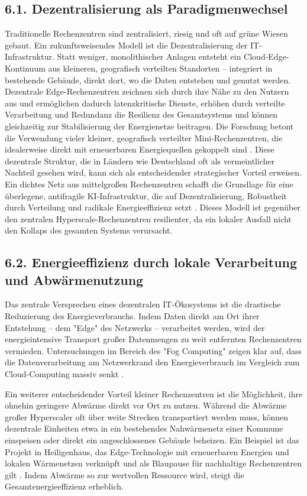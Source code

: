 \documentclass[12pt, a4paper]{article}
\begin{document}
	\subsection*{6.1. Dezentralisierung als Paradigmenwechsel}
	Traditionelle Rechenzentren sind zentralisiert, riesig und oft auf grüne Wiesen gebaut.
	Ein zukunftsweisendes Modell ist die Dezentralisierung der IT-Infrastruktur. Statt weniger,
	monolithischer Anlagen entsteht ein Cloud-Edge-Kontinuum aus kleineren, geografisch
	verteilten Standorten – integriert in bestehende Gebäude, direkt dort, wo die Daten
	entstehen und genutzt werden. Dezentrale Edge-Rechenzentren zeichnen sich durch ihre Nähe
	zu den Nutzern aus und ermöglichen dadurch latenzkritische Dienste, erhöhen durch verteilte
	Verarbeitung und Redundanz die Resilienz des Gesamtsystems und können gleichzeitig zur
	Stabilisierung der Energienetze beitragen. Die Forschung betont die Verwendung vieler
	kleiner, geografisch verteilter Mini-Rechenzentren, die idealerweise direkt mit erneuerbaren
	Energiequellen gekoppelt sind \cite{kammen2014}. Diese dezentrale Struktur, die in Ländern
	wie Deutschland oft als vermeintlicher Nachteil gesehen wird, kann sich als entscheidender
	strategischer Vorteil erweisen. Ein dichtes Netz aus mittelgroßen Rechenzentren schafft
	die Grundlage für eine überlegene, antifragile KI-Infrastruktur, die auf Dezentralisierung,
	Robustheit durch Verteilung und radikale Energieeffizienz setzt \cite{xpert2025}. Dieses
	Modell ist gegenüber den zentralen Hyperscale-Rechenzentren resilienter, da ein lokaler
	Ausfall nicht den Kollaps des gesamten Systems verursacht.
	
	\subsection*{6.2. Energieeffizienz durch lokale Verarbeitung und Abwärmenutzung}
	Das zentrale Versprechen eines dezentralen IT-Ökosystems ist die drastische Reduzierung
	des Energieverbrauchs. Indem Daten direkt am Ort ihrer Entstehung – dem "Edge" des Netzwerks
	– verarbeitet werden, wird der energieintensive Transport großer Datenmengen zu weit
	entfernten Rechenzentren vermieden. Untersuchungen im Bereich des "Fog Computing" zeigen
	klar auf, dass die Datenverarbeitung am Netzwerkrand den Energieverbrauch im Vergleich zum
	Cloud-Computing massiv senkt \cite{wang2025, kaneti2025}.
	
	Ein weiterer entscheidender Vorteil kleiner Rechenzentren ist die Möglichkeit, ihre ohnehin
	geringere Abwärme direkt vor Ort zu nutzen. Während die Abwärme großer Hyperscaler oft über
	weite Strecken transportiert werden muss, können dezentrale Einheiten etwa in ein bestehendes
	Nahwärmenetz einer Kommune einspeisen oder direkt ein angeschlossenes Gebäude beheizen.
	Ein Beispiel ist das Projekt in Heiligenhaus, das Edge-Technologie mit erneuerbaren Energien
	und lokalen Wärmenetzen verknüpft und als Blaupause für nachhaltige Rechenzentren gilt
	\cite{neueenergie2025}. Indem Abwärme so zur wertvollen Ressource wird, steigt die
	Gesamtenergieeffizienz erheblich.
	
\end{document}
